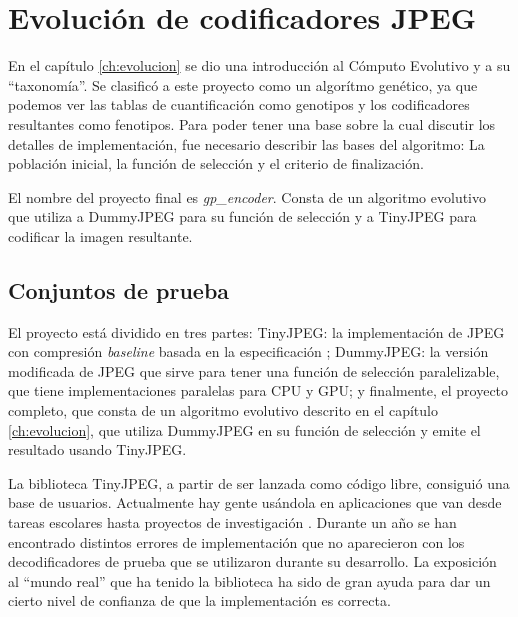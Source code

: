 
\chapter{Evolución de codificadores JPEG}\label{ch:resultados_evolucion}

En el capítulo \ref{ch:evolucion} se dio una introducción al \gls{Cómputo Evolutivo}
y a su ``taxonomía''. Se clasificó a este proyecto como un algorítmo genético,
ya que podemos ver las tablas de cuantificación como genotipos y los
codificadores resultantes como fenotipos. Para poder tener una base sobre la
cual discutir los detalles de implementación, fue necesario describir las bases
del algoritmo: La población inicial, la función de selección y el criterio de
finalización.

El nombre del proyecto final es \emph{gp\_encoder}. Consta de un algoritmo
evolutivo que utiliza a DummyJPEG para su función de selección y a TinyJPEG
para codificar la imagen resultante.

\section{Conjuntos de prueba} \label{sec:testset}

El proyecto está dividido en tres partes: TinyJPEG: la implementación de JPEG
con compresión \emph{baseline} basada en la especificación \cite{jpeg-spec};
DummyJPEG: la versión modificada de JPEG que sirve para tener una función de
selección paralelizable, que tiene implementaciones paralelas para CPU y GPU; y
finalmente, el proyecto completo, que consta de un algoritmo evolutivo descrito
en el capítulo \ref{ch:evolucion}, que utiliza DummyJPEG en su función de selección y emite
el resultado usando TinyJPEG.

La biblioteca TinyJPEG, a partir de ser lanzada como código libre, consiguió
una base de usuarios. Actualmente hay gente usándola en aplicaciones que van
desde tareas escolares hasta proyectos de investigación \cite{humblebrag}.
Durante un año se han encontrado distintos errores de implementación que no
aparecieron con los decodificadores de prueba que se utilizaron durante su
desarrollo. La exposición al ``mundo real'' que ha tenido la biblioteca ha sido
de gran ayuda para dar un cierto nivel de confianza de que la implementación es
correcta.

